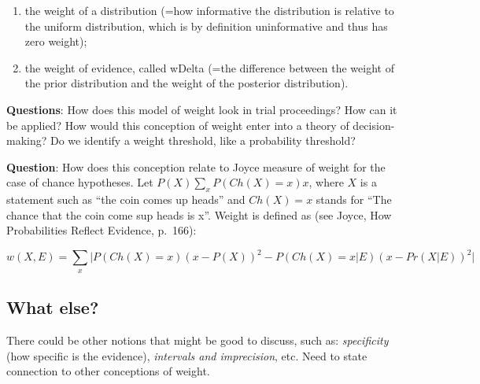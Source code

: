 \documentclass[
  10pt,
  dvipsnames,enabledeprecatedfontcommands]{scrartcl}
\begin{document}
\begin{enumerate}
\def\labelenumi{(\alph{enumi})}
\item
  the weight of a distribution (=how informative the distribution is
  relative to the uniform distribution, which is by definition
  uninformative and thus has zero weight);
\item
  the weight of evidence, called wDelta (=the difference between the
  weight of the prior distribution and the weight of the posterior
  distribution).
\end{enumerate}

\textbf{Questions}: How does this model of weight look in trial
proceedings? How can it be applied? How would this conception of weight
enter into a theory of decision-making? Do we identify a weight
threshold, like a probability threshold?


\textbf{Question}: How does this conception relate to Joyce measure of
weight for the case of chance hypotheses. Let
\(P(X)\sum_x P(Ch(X)=x)x\), where \(X\) is a statement such as ``the
coin comes up heads'' and \(Ch(X)=x\) stands for ``The chance that the
coin come sup heads is x''. Weight is defined as (see Joyce, How
Probabilities Reflect Evidence, p.~166):


\[w(X, E) = \sum_x \vert P(Ch(X)=x)(x-P(X))^2 - P(Ch(X)=x \vert E)(x-Pr(X \vert E))^2\vert\]

\hypertarget{what-else}{%
\subsection{What else?}\label{what-else}}

There could be other notions that might be good to discuss, such as:
\emph{specificity} (how specific is the evidence), \emph{intervals and
imprecision}, etc. Need to state connection to other conceptions of
weight.

\end{document}
